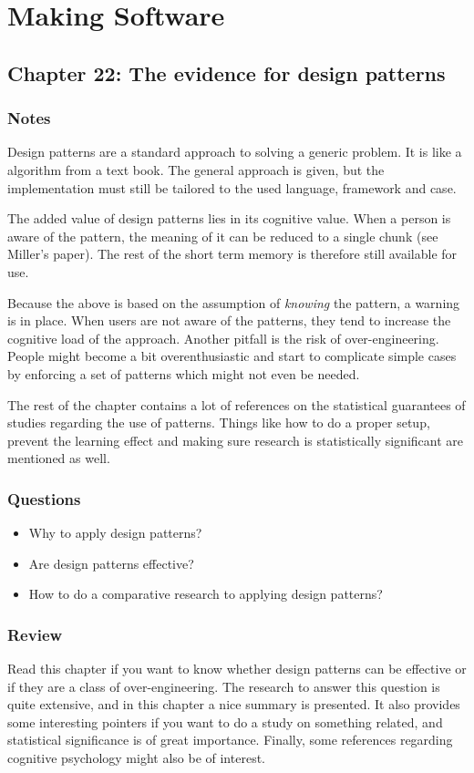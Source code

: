 \chapter{Making Software \cite{makingsoftware}}
\section{Chapter 22: The evidence for design patterns}
\subsection{Notes}
Design patterns are a standard approach to solving a generic problem. 
It is like a algorithm from a text book. 
The general approach is given, but the implementation must still be tailored to the used language, framework and case. 

The added value of design patterns lies in its cognitive value. 
When a person is aware of the pattern, the meaning of it can be reduced to a single chunk (see Miller's paper). 
The rest of the short term memory is therefore still available for use.

Because the above is based on the assumption of \emph{knowing} the pattern, a warning is in place. 
When users are not aware of the patterns, they tend to increase the cognitive load of the approach. 
Another pitfall is the risk of over-engineering. 
People might become a bit overenthusiastic and start to complicate simple cases by enforcing a set of patterns which might not even be needed.

The rest of the chapter contains a lot of references on the statistical guarantees of studies regarding the use of patterns. 
Things like how to do a proper setup, prevent the learning effect and making sure research is statistically significant are mentioned as well.

\subsection{Questions}
\begin{itemize}
  \item Why to apply design patterns?
  \item Are design patterns effective?
  \item How to do a comparative research to applying design patterns?
\end{itemize}

\subsection{Review}
Read this chapter if you want to know whether design patterns can be effective or if they are a class of over-engineering.
The research to answer this question is quite extensive, and in this chapter a nice summary is presented. 
It also provides some interesting pointers if you want to do a study on something related, and statistical significance is of great importance.
Finally, some references regarding cognitive psychology might also be of interest.
